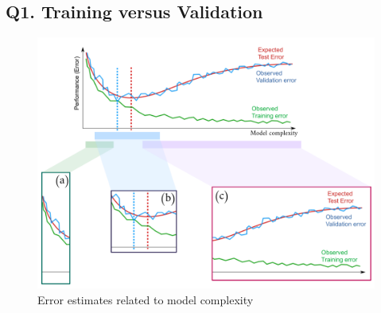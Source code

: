 \documentclass[tikz,14pt,fleqn]{article}
\begin{document}
\subsection{Q1. Training versus Validation}
\begin{figure}[h!]
    \centering
    \vspace*{-0.5cm}
    \includegraphics[width=0.5\linewidth]{fig/ex_train_val_test.png}
    \vspace*{-0.3cm}
    \caption{Error estimates related to model complexity}
    \vspace*{-0.3cm}
    \label{fig:q1}
\end{figure}
\end{document}
